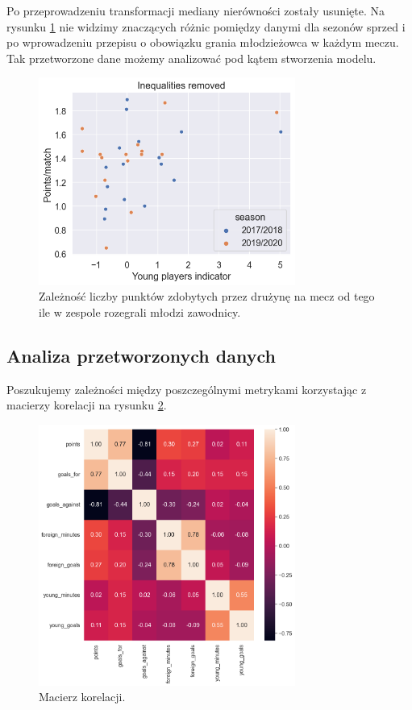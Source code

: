 \documentclass{article}
\begin{document}
Po przeprowadzeniu transformacji mediany nierówności zostały usunięte. Na rysunku \ref{fig:min_by_sea_trans} nie widzimy znaczących różnic pomiędzy danymi dla sezonów sprzed i po wprowadzeniu przepisu o obowiązku grania młodzieżowca w każdym meczu. Tak przetworzone dane możemy analizować pod kątem stworzenia modelu.

\begin{figure}[h!]
    \centering
    \includegraphics[width=0.75\textwidth]{min_by_sea_trans.png}
    \caption{Zależność liczby punktów zdobytych przez drużynę na mecz od tego ile w zespole rozegrali młodzi zawodnicy.}
    \label{fig:min_by_sea_trans}
\end{figure}

\subsection{Analiza przetworzonych danych}

Poszukujemy zależności między poszczególnymi metrykami korzystając z macierzy korelacji na rysunku \ref{fig:corr}.

\begin{figure}[h!]
    \centering
    \includegraphics[width=0.75\textwidth]{corr_mat.png}
    \caption{Macierz korelacji.}
    \label{fig:corr}
\end{figure}
\end{document}
